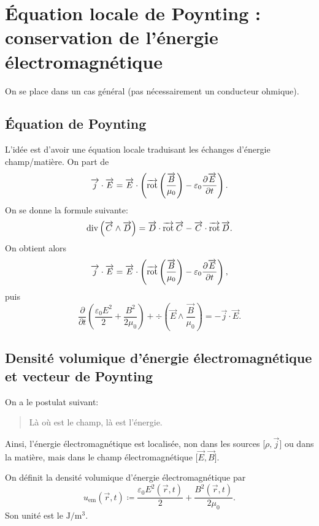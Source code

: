 \section[Équation locale de Poynting]{Équation locale de Poynting : conservation de l'énergie électromagnétique}

On se place dans un cas général (pas nécessairement un conducteur ohmique).

\subsection{Équation de Poynting}

L'idée est d'avoir une équation locale traduisant les échanges d'énergie champ/matière.
On part de
\begin{equation*}
    \protect\overrightarrow{{j}}\cdot\protect\overrightarrow{{E}}=\protect\overrightarrow{{E}}\cdot\left(
        \operatorname{\overrightarrow{\text{rot}}}\left(\frac{\protect\overrightarrow{{B}}}{\mu_0}\right)-\varepsilon_0\frac{\partial\protect\overrightarrow{{E}}}{\partial t}
    \right).
\end{equation*}
On se donne la formule suivante:
\begin{equation*}
    \operatorname{div}\left(\protect\overrightarrow{{C}}\wedge\protect\overrightarrow{{D}}\right)=\protect\overrightarrow{{D}}\cdot\operatorname{\overrightarrow{\text{rot}}}\protect\overrightarrow{{C}}-\protect\overrightarrow{{C}}\cdot\operatorname{\overrightarrow{\text{rot}}}\protect\overrightarrow{{D}}.
\end{equation*}
On obtient alors
\begin{equation*}
    \protect\overrightarrow{{j}}\cdot\protect\overrightarrow{{E}}=\protect\overrightarrow{{E}}\cdot\left(\operatorname{\overrightarrow{\text{rot}}}\left(\frac{\protect\overrightarrow{{B}}}{\mu_0}\right)-\varepsilon_0\frac{\partial\protect\overrightarrow{{E}}}{\partial t}\right),
\end{equation*}
puis
\begin{equation*}
    \boxed{
        \frac{\partial}{\partial t}\left(
            \frac{\varepsilon_0 E^{2}}{2}+\frac{B^{2}}{2\mu_0}
        \right)+\div\left(\vec{E}\wedge\frac{\vec{B}}{\mu_0}\right)=-\vec{j}\cdot\vec{E}.
    }
\end{equation*}

\subsection{Densité volumique d'énergie électromagnétique et vecteur de Poynting}

On a le postulat suivant:
\begin{quote}
    Là où est le champ, là est l'énergie.
\end{quote}
Ainsi, l'énergie électromagnétique est localisée, non dans les sources [$\rho,\vec{j}$] ou dans la matière, mais dans le champ électromagnétique [$\vec{E},\vec{B}$].

On définit la densité volumique d'énergie électromagnétique par 
\begin{equation*}
    \boxed{
        u_{\mathrm{em}}(\vec{r},t)\coloneqq\frac{\varepsilon_0 E^{2}(\vec{r},t)}{2}+\frac{B^{2}(\vec{r},t)}{2\mu_0}.
    }
\end{equation*}
Son unité est le $\si{\joule\per\metre\cubed}$.

